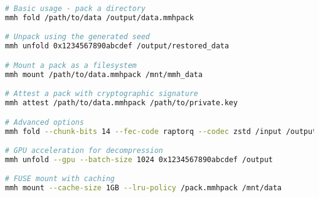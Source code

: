 \begin{lstlisting}[language=bash,caption={MMH-RS CLI Examples},label=lst:cli-examples]
# Basic usage - pack a directory
mmh fold /path/to/data /output/data.mmhpack

# Unpack using the generated seed
mmh unfold 0x1234567890abcdef /output/restored_data

# Mount a pack as a filesystem
mmh mount /path/to/data.mmhpack /mnt/mmh_data

# Attest a pack with cryptographic signature
mmh attest /path/to/data.mmhpack /path/to/private.key

# Advanced options
mmh fold --chunk-bits 14 --fec-code raptorq --codec zstd /input /output

# GPU acceleration for decompression
mmh unfold --gpu --batch-size 1024 0x1234567890abcdef /output

# FUSE mount with caching
mmh mount --cache-size 1GB --lru-policy /pack.mmhpack /mnt/data
\end{lstlisting} 